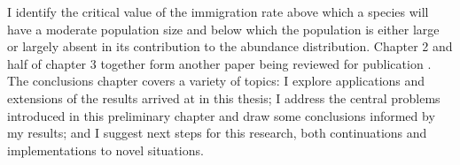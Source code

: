 I identify the critical value of the immigration rate above which a species will have a moderate population size and below which the population is either large or largely absent in its contribution to the abundance distribution. %
Chapter 2 and half of chapter 3 together form another paper being reviewed for publication \cite{Badali2018}. %
The conclusions chapter covers a variety of topics: I explore applications and extensions of the results arrived at in this thesis; I address the central problems introduced in this preliminary chapter and draw some conclusions informed by my results; and I suggest next steps for this research, both continuations and implementations to novel situations. 
\fi


